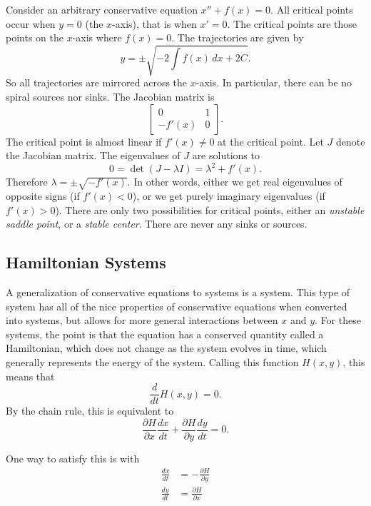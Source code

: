 \documentclass{ximera}
\begin{document}
Consider an arbitrary conservative equation $x'' + f(x) = 0$. All critical points occur when $y=0$ (the $x$-axis), that is when $x' = 0$.  The critical points are those points on the $x$-axis where $f(x) = 0$. The trajectories are given by
\begin{equation*}
    y = \pm \sqrt{ - 2 \int f(x)\, dx + 2C} .
\end{equation*}
So all trajectories are mirrored across the $x$-axis.  In particular, there can be no spiral sources nor sinks. The Jacobian matrix is
\begin{equation*}
    \begin{bmatrix}
        0 & 1 \\
        -f'(x) & 0
    \end{bmatrix} .
\end{equation*}
The critical point is almost linear if $f'(x) \not= 0$ at the critical point.  Let $J$ denote the Jacobian matrix. The eigenvalues of $J$ are solutions to
\begin{equation*}
    0 = \det(J - \lambda I) = \lambda^2 + f'(x) .
\end{equation*}
Therefore $\lambda = \pm \sqrt{-f'(x)}$.  In other words, either we get real eigenvalues of opposite signs (if $f'(x) < 0$), or we get purely imaginary eigenvalues (if $f'(x) > 0$). There are only two possibilities for critical points, either an \emph{unstable saddle point}, or a \emph{stable center}. There are never any sinks or sources.

\subsection{Hamiltonian Systems}

A generalization of conservative equations to systems is a  system. This type of system has all of the nice properties of conservative equations when converted into systems, but allows for more general interactions between $x$ and $y$. For these systems, the point is that the equation has a conserved quantity called a Hamiltonian, which does not change as the system evolves in time, which generally represents the energy of the system. Calling this function $H(x,y)$, this means that
\[ 
    \frac{d}{dt}H(x,y) = 0. 
\] 
By the chain rule, this is equivalent to
\[ 
    \frac{\partial H}{\partial x} \frac{dx}{dt} + \frac{\partial H}{\partial y} \frac{dy}{dt} = 0.
\]

One way to satisfy this is with 
\begin{equation}
    \begin{split}
        \frac{dx}{dt} &= -\frac{\partial H}{\partial y} \\
        \frac{dy}{dt} &= \frac{\partial H}{\partial x}
    \end{split}
    \label{eq:HamilDef}
\end{equation} 
\end{document}
